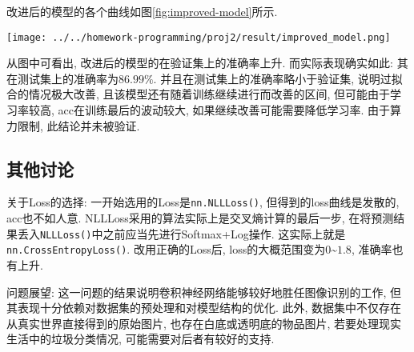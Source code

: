 改进后的模型的各个曲线如图\ref{fig:improved-model}所示.

\begin{figure*}[htbp]
    \centering
    \texttt{[image: ../../homework-programming/proj2/result/improved\_model.png]}
    \caption{改进后模型的Loss和Acc值随训练进程变化}\label{fig:improved-model}
\end{figure*}

从图中可看出, 改进后的模型的在验证集上的准确率上升. 而实际表现确实如此: 其在测试集上的准确率为$86.99\%$. 并且在测试集上的准确率略小于验证集, 说明过拟合的情况极大改善, 且该模型还有随着训练继续进行而改善的区间, 但可能由于学习率较高, acc在训练最后的波动较大, 如果继续改善可能需要降低学习率. 由于算力限制, 此结论并未被验证.

\subsection{其他讨论}

关于Loss的选择: 一开始选用的Loss是\verb|nn.NLLLoss()|, 但得到的loss曲线是发散的, acc也不如人意. NLLLoss采用的算法实际上是交叉熵计算的最后一步, 在将预测结果丢入\verb|NLLLoss()|中之前应当先进行Softmax+Log操作. 这实际上就是\verb|nn.CrossEntropyLoss()|. 改用正确的Loss后, loss的大概范围变为$0$\textasciitilde$1.8$, 准确率也有上升.

问题展望: 这一问题的结果说明卷积神经网络能够较好地胜任图像识别的工作, 但其表现十分依赖对数据集的预处理和对模型结构的优化. 此外, 数据集中不仅存在从真实世界直接得到的原始图片, 也存在白底或透明底的物品图片, 若要处理现实生活中的垃圾分类情况, 可能需要对后者有较好的支持.
